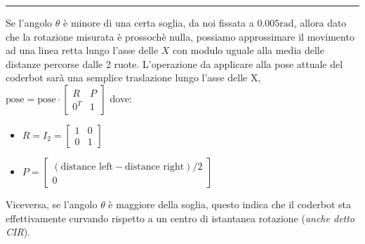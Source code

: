 \documentclass[11pt]{article}
\begin{document}
\begin{center}
\rule[1ex]{.5\textwidth}{.5pt}
\end{center}

Se l'angolo \(\theta\) è minore di una certa soglia, da noi fissata a \(0.005\text{rad}\), allora dato che la rotazione misurata è prossochè nulla, possiamo approssimare il movimento ad una linea retta lungo l'asse delle \(X\) con modulo uguale alla media delle distanze percorse dalle 2 ruote.
L'operazione da applicare alla pose attuale del coderbot sarà una semplice traslazione lungo l'asse delle X, \(\text{pose}=\text{pose}\cdot\begin{bmatrix}R&P\\0^T&1\end{bmatrix}\) dove:
\begin{itemize}
\item \(R=I_2=\begin{bmatrix}1&0\\0&1\end{bmatrix}\)
\item \(P= \begin{bmatrix}(\text{distance left} - \text{distance right})/2\\0\end{bmatrix}\)
\end{itemize}

Viceversa, se l'angolo \(\theta\) è maggiore della soglia, questo indica che il coderbot sta effettivamente curvando rispetto a un centro di istantanea rotazione (\emph{anche detto CIR}).
\end{document}
